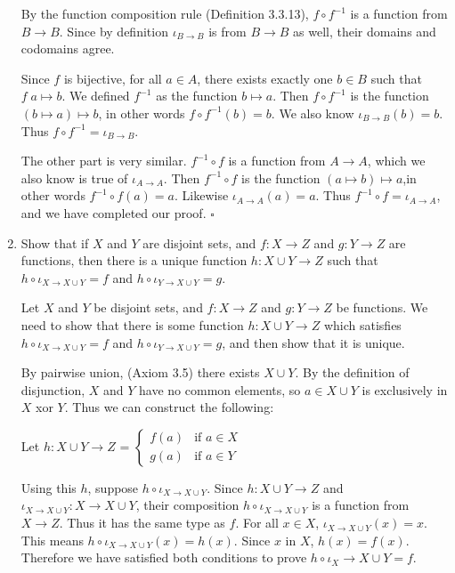\documentclass[../../main.tex]{subfiles}
\begin{document}
\begin{enumerate}
\begin{prf}
        By the function composition rule (Definition 3.3.13), $f \circ f^{-1}$ is a function from $B \to B$. Since by definition $\iota_{B \to B}$ is from $B \to B$ as well, their domains and codomains agree.

        Since $f$ is bijective, for all $a \in A$, there exists exactly one $b \in B$ such that $f \; a \mapsto b$. We defined $f^{-1}$ as the function $b \mapsto a$. Then $f \circ f^{-1}$ is the function $(b \mapsto a) \mapsto b$, in other words $f \circ f^{-1}(b)=b$. We also know $\iota_{B \to B}(b)=b$. Thus $f \circ f^{-1} = \iota_{B \to B}$.

        The other part is very similar. $f^{-1} \circ f$ is a function from $A \to A$, which we also know is true of $\iota_{A \to A}$. Then $f^{-1} \circ f$ is the function $(a \mapsto b) \mapsto a$,in other words $f^{-1} \circ f(a)=a$. Likewise $\iota_{A \to A}(a)=a$. Thus $f^{-1} \circ f = \iota_{A \to A}$, and we have completed our proof.
        $\square$
    \end{prf}

    \item 
    \begin{q}
        Show that if $X$ and $Y$ are disjoint sets, and $f: X \to Z$ and $g: Y \to Z$ are functions, then there is a unique function $h: X \cup Y \to Z$ such that $h \circ \iota_{X \to X \cup Y} = f$ and $h \circ \iota_{Y \to X \cup Y} = g.$
    \end{q}

    
    \begin{prf}
        Let $X$ and $Y$ be disjoint sets, and $f: X \to Z$ and $g: Y \to Z$ be functions.
        We need to show that there is some function $h: X \cup Y \to Z$ which satisfies $h \circ \iota_{X \to X \cup Y} = f$ and $h \circ \iota_{Y \to X \cup Y} = g$, and then show that it is unique.
    
        By pairwise union, (Axiom 3.5) there exists $X \cup Y$. By the definition of disjunction, $X$ and $Y$ have no common elements, so $a \in X \cup Y$ is exclusively in $X$ xor $Y$. Thus we can construct the following:
    
        Let $h: X \cup Y \to Z$ = \(
            \begin{cases}
                f(a) & \text{if } a \in X \\
                g(a) & \text{if } a \in Y
            \end{cases}
        \)

    
        Using this $h$, suppose $h \circ \iota_{X \to X \cup Y}$.
        Since $h: X \cup Y \to Z$ and $\iota_{X \to X \cup Y}: X \to X \cup Y$, their composition $h \circ \iota_{X \to X \cup Y}$ is a function from $X \to Z$. 
        Thus it has the same type as $f$.
        For all $x \in X$, $\iota_{X \to X \cup Y}(x)=x$.
        This means $h \circ \iota_{X \to X \cup Y}(x) = h(x)$. Since $x$ in $X$, $h(x) = f(x)$.
        Therefore we have satisfied both conditions to prove $h \circ \iota_X \to X \cup Y = f$.


\end{prf}
\end{enumerate}
\end{document}
